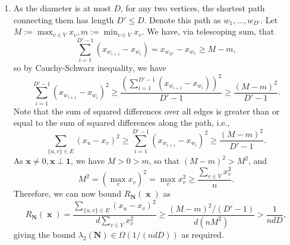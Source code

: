 \documentclass[12pt]{article}
\DeclareMathOperator{\vol}{vol}
\DeclareMathOperator{\xb}{\mathbf{x}}
\begin{document}
\begin{enumerate}
For this cut, $S=A$ and $V\setminus S=B$. Thus $\min(\vol(S),\vol(V\setminus S))=d(n/2)=n(n-2)/4$ and $|E(S,V\setminus S)|=2$, and
$$\Phi(S)=\frac{|E(S,V\setminus S)|}{\min(\vol(S),\vol(V\setminus S))}=\frac{2}{n(n-2)/4}\in O\left(\dfrac{1}{n^2}\right).$$
Thus we have
$$\lambda_2\le2\Phi(G)\le 2\Phi(S)\in O\left(\dfrac{1}{n^2}\right).$$
\item
As the diameter is at most $D$, for any two vertices, the shortest path connecting them has length $D'\le D$. Denote this path as $w_1, \dots, w_{D'}$. Let $\displaystyle M:=\max_{v\in V} x_v, m:=\min_{v\in V} x_v$. We have, via telescoping sum, that
$$\sum_{i=1}^{D'-1}(x_{w_{i+1}}-x_{w_i})=x_{w_{D'}}-x_{w_1}\ge M-m,$$
so by Cauchy-Schwarz inequality, we have
$$\sum_{i=1}^{D'-1}(x_{w_{i+1}}-x_{w_i})^2\ge\frac{\left(\sum_{i=1}^{D'-1}(x_{w_{i+1}}-x_{w_i})\right)^2}{D'-1}\ge\frac{(M-m)^2}{D'-1}.$$
Note that the sum of squared differences over all edges is greater than or equal to the sum of squared differences along the path, i.e.,
$$\sum_{\{u,v\}\in E}(x_u-x_v)^2\ge\sum_{i=1}^{D'-1}(x_{w_{i+1}}-x_{w_i})^2\ge\frac{(M-m)^2}{D'-1}.$$
As $\mathbf{x}\ne0,\mathbf{x}\perp\mathbf{1}$, we have $M>0>m$, so that $(M-m)^2>M^2$, and
$$M^2=(\max_v x_v)^2=\max_v x_v^2\ge\frac{\sum_{v\in V}x_v^2}{n}.$$
Therefore, we can now bound $R_{\mathbf{N}}(\xb)$ as
$$R_{\mathbf{N}}(\xb)=\frac{\sum_{\{u,v\}\in E}(x_u-x_v)^2}{d\sum_{v\in V}x_v^2}\ge\frac{(M-m)^2/(D'-1)}{d(nM^2)}>\frac{1}{ndD},$$
giving the bound $\lambda_2(\mathbf{N})\in\Omega(1/(ndD))$ as required.
\end{enumerate}
\end{document}
